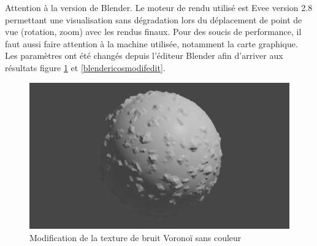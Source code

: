 \documentclass[a4paper]{article}
\begin{document}
Attention à la version de Blender. Le moteur de rendu utilisé est Evee version 2.8 permettant une visualisation sans dégradation lors du déplacement de point de vue (rotation, zoom) avec les rendus finaux. Pour des soucis de performance, il faut aussi faire attention à la machine utilisée, notamment la carte graphique.\\

Les paramètres ont été changés depuis l'éditeur Blender afin d'arriver aux résultats figure \ref{blendericosmodif} et \ref{blendericosmodifedit}.\\

\begin{figure}[!h]
\begin{center} \includegraphics[width=0.8\linewidth]{img/blender/blender_2.png} \end{center}
\caption{\label{blendericosmodif}Modification de la texture de bruit Voronoï sans couleur}
\end{figure}
\end{document}
